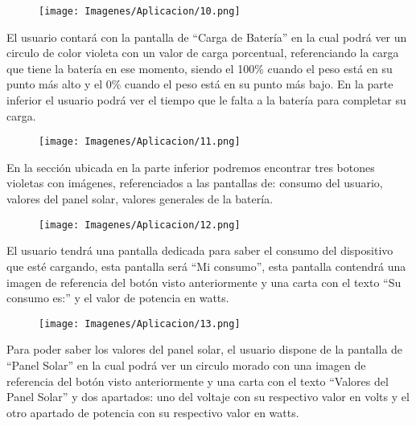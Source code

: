         \begin{figure} [H]
            \centering
            \texttt{[image: Imagenes/Aplicacion/10.png]}
        \end{figure}

        El usuario contará con la pantalla de “Carga de Batería” en la cual podrá ver un circulo de color violeta con un valor de carga porcentual, referenciando la carga que tiene la batería en ese momento, siendo el 100\% cuando el peso está en su punto más alto y el 0\% cuando el peso está en su punto más bajo. En la parte inferior el usuario podrá ver el tiempo que le falta a la batería para completar su carga.\par

        \begin{figure} [H]
            \centering
            \texttt{[image: Imagenes/Aplicacion/11.png]}
        \end{figure}
        
        En la sección ubicada en la parte inferior podremos encontrar tres botones violetas con imágenes, referenciados a las pantallas de: consumo del usuario, valores del panel solar, valores generales de la batería.\par

        \begin{figure} [H]
            \centering
            \texttt{[image: Imagenes/Aplicacion/12.png]}
        \end{figure}

        El usuario tendrá una pantalla dedicada para saber el consumo del dispositivo que esté cargando, esta pantalla será “Mi consumo”, esta pantalla contendrá una imagen de referencia del botón visto anteriormente y una carta con el texto “Su consumo es:” y el valor de potencia en watts.\par

        \begin{figure} [H]
            \centering
            \texttt{[image: Imagenes/Aplicacion/13.png]}
        \end{figure}

        Para poder saber los valores del panel solar, el usuario dispone de la pantalla de “Panel Solar” en la cual podrá ver un circulo morado con una imagen de referencia del botón visto anteriormente y una carta con el texto “Valores del Panel Solar” y dos apartados: uno del voltaje con su respectivo valor en volts y el otro apartado de potencia con su respectivo valor en watts.\par


